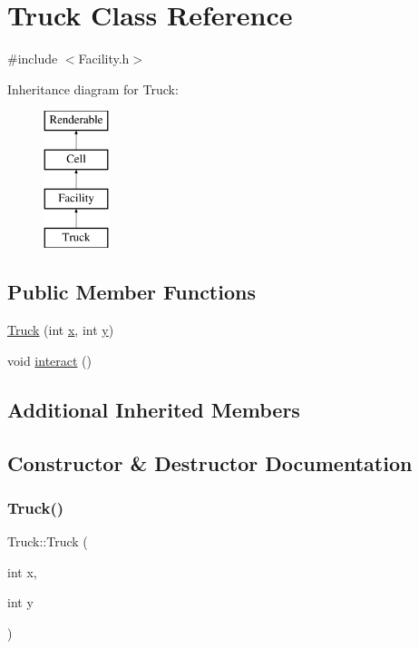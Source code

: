 \hypertarget{classTruck}{}\section{Truck Class Reference}
\label{classTruck}


{\ttfamily \#include $<$Facility.\+h$>$}

Inheritance diagram for Truck\+:\begin{figure}[H]
\begin{center}
\leavevmode
\includegraphics[height=4.000000cm]{classTruck}
\end{center}
\end{figure}
\subsection*{Public Member Functions}
\begin{DoxyCompactItemize}
\item 
\mbox{\hyperlink{classTruck_a32610a125a2178949f046810760116b7}{Truck}} (int \mbox{\hyperlink{classFacility_a97a4d1f6f807e0e74c4283cf120daed9}{x}}, int \mbox{\hyperlink{classFacility_a28d1fbfe0699e800db094161504b0e44}{y}})
\item 
void \mbox{\hyperlink{classTruck_ade3385f07d9db954d329e3d5de180f2e}{interact}} ()
\end{DoxyCompactItemize}
\subsection*{Additional Inherited Members}


\subsection{Constructor \& Destructor Documentation}
\mbox{\label{classTruck_a32610a125a2178949f046810760116b7}} 
\subsubsection{\texorpdfstring{Truck()}{Truck()}}
{\footnotesize\ttfamily Truck\+::\+Truck (\begin{DoxyParamCaption}\item[{int}]{x,  }\item[{int}]{y }\end{DoxyParamCaption})}



